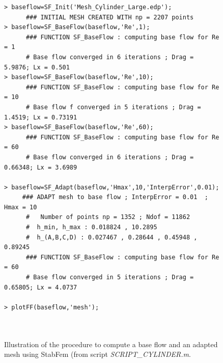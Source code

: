 \documentclass[twocolumn,10pt]{asme2ej}
\begin{document}
\begin{figure}
\small
\begin{lstlisting}
> baseflow=SF_Init('Mesh_Cylinder_Large.edp');
      ### INITIAL MESH CREATED WITH np = 2207 points
> baseflow=SF_BaseFlow(baseflow,'Re',1);
      ### FUNCTION SF_BaseFlow : computing base flow for Re = 1
      # Base flow converged in 6 iterations ; Drag = 5.9876; Lx = 0.501
> baseflow=SF_BaseFlow(baseflow,'Re',10);
      ### FUNCTION SF_BaseFlow : computing base flow for Re = 10
      # Base flow f converged in 5 iterations ; Drag = 1.4519; Lx = 0.73191
> baseflow=SF_BaseFlow(baseflow,'Re',60);
      ### FUNCTION SF_BaseFlow : computing base flow for Re = 60
      # Base flow converged in 6 iterations ; Drag = 0.66348; Lx = 3.6989

> baseflow=SF_Adapt(baseflow,'Hmax',10,'InterpError',0.01);
     ### ADAPT mesh to base flow ; InterpError = 0.01  ; Hmax = 10
      #   Number of points np = 1352 ; Ndof = 11862
      #  h_min, h_max : 0.018824 , 10.2895
      #  h_(A,B,C,D) : 0.027467 , 0.28644 , 0.45948 , 0.89245
      ### FUNCTION SF_BaseFlow : computing base flow for Re = 60
      # Base flow converged in 5 iterations ; Drag = 0.65805; Lx = 4.0737

> plotFF(baseflow,'mesh');



\end{lstlisting}
\normalsize

\caption{Illustration of the procedure to compute a base flow and an adapted mesh using StabFem (from script {\em SCRIPT\_CYLINDER.m}. }
\end{figure}
\end{document}
